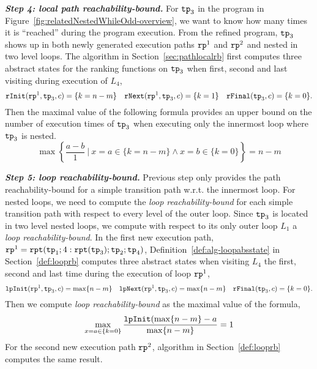 \textbf{\emph{Step 4: local path reachability-bound.}}
For $\mathtt{tp}_3$ in the program in Figure~\ref{fig:relatedNestedWhileOdd-overview}, we want to know how many times it is ``reached'' during the program execution.
From the refined program, $\mathtt{tp}_3$ shows up in both newly generated execution paths $\mathtt{rp}^1$ and $\mathtt{rp}^2$  and nested in two level loops.
The algorithm in Section~\ref{sec:pathlocalrb} first
computes three abstract states for the ranking functions on $\mathtt{tp}_3$ when first, second and last visiting during execution of $L_4$,
\begin{equation*}
    \mathtt{rInit}(\mathtt{rp}^1, \mathtt{tp}_3, c) = \{k = n - m\} \quad
    \mathtt{rNext}(\mathtt{rp}^1, \mathtt{tp}_3, c) = \{k = 1\} \quad
    \mathtt{rFinal}(\mathtt{tp}_3, c) = \{ k = 0 \}.
\end{equation*}
Then  the maximal value of the following formula provides   
an upper bound on the number of execution times of $\mathtt{tp}_3$ when executing only the innermost loop where $\mathtt{tp}_3$ is nested. 
\[
    \max
    \left\{ 
        {\frac{a - b}{1}} 
        ~\vert~
        x = a \in \{k = n - m\}
        \land x = b \in \{ k = 0 \}
    \right\}  = n - m
\]

\textbf{\emph{Step 5: loop reachability-bound.}}
Previous step only provides the path reachability-bound for a simple transition path w.r.t. the innermost loop.
For nested loops, we need to compute the \emph{loop reachability-bound} for each simple transition path with respect to every level of the outer loop.
Since $\mathtt{tp}_3$ is located in two level nested loops, we compute 
with respect to its only outer loop $L_1$ a \emph{loop reachability-bound}.
In the first new execution path, $\mathtt{rp}^1 = \mathtt{rpt}(\mathtt{tp}_1; 4:\mathtt{rpt}(\mathtt{tp}_3); \mathtt{tp}_2; \mathtt{tp}_4)$,
Definition~\ref{def:alg-loopabsstate} in Section~\ref{def:looprb} computes three abstract states when visiting $L_4$ the first, second and last time during the execution of loop $\mathtt{rp}^1$,
\begin{equation*}
\mathtt{lpInit}(\mathtt{rp}^1, \mathtt{tp}_3, c) = \max\{ n - m\} \quad
\mathtt{lpNext}(\mathtt{rp}^1, \mathtt{tp}_3, c) = \max\{n - m\} \quad
\mathtt{rFinal}(\mathtt{tp}_3, c) = \{k = 0\}.
\end{equation*}
Then we compute \emph{loop reachability-bound} as the maximal value of the formula,
\[
    \max\limits_{x = a \in \{k = 0\}}
    \frac{\mathtt{lpInit}(\max\{n - m\} - a }{\max\{n - m\}} = 1
  \]
For the second new execution path $\mathtt{rp}^2$, algorithm in Section~\ref{def:looprb} computes the same result.

